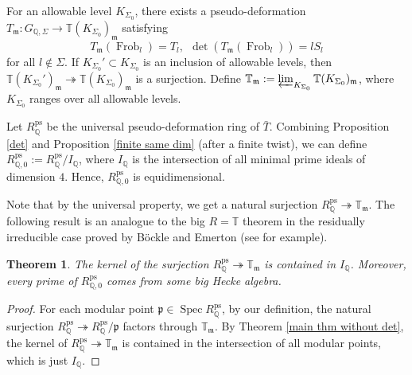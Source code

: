 \documentclass[a4paper, 12pt]{amsart}
\newtheorem{thm}{Theorem}[subsection]
\DeclareMathOperator{\Spec}{Spec}
\DeclareMathOperator{\Frob}{Frob}
\def\ps{\mathrm{ps}}
\newcommand{\Q}{\mathbb{Q}}
\newcommand{\T}{\mathbb{T}}
\newcommand{\kp}{\mathfrak{p}}
\newcommand{\km}{\mathfrak{m}}
\begin{document}
    For an allowable level $K_{\Sigma_0}$, there exists a pseudo-deformation $T_\km: G_{\Q, \Sigma} \to \T(K_{\Sigma_0})_\km$ satisfying 
    $$ T_\km(\Frob_l)=T_l ,  ~~\det(T_\km(\Frob_l)) = lS_l $$
    for all $l \notin \Sigma$. If $K_{\Sigma_0}' \subset K_{\Sigma_0}$ is an inclusion of allowable levels, then $\T(K_{\Sigma_0}')_\km \twoheadrightarrow \T(K_{\Sigma_0})_\km$ is a surjection. Define $\T_\km := \varprojlim_{K_{\Sigma_0}} \T(K_{\Sigma_0})_\km$, where $K_{\Sigma_0} $ ranges over all allowable levels.
    
    Let $R_\Q^\ps$ be the universal pseudo-deformation ring of $\bar{T}$.  Combining Proposition \ref{det} and Proposition \ref{finite same dim} (after a finite twist), we can define $R_{\Q, 0}^\ps := R_\Q^\ps/I_\Q$, where $I_\Q $ is the intersection of all minimal prime ideals of dimension $4$. Hence, $R_{\Q, 0}^\ps$ is equidimensional.
    
    Note that by the universal property, we get a natural surjection $R_\Q^\ps \twoheadrightarrow \T_\km $. The following result is an analogue to the big $R=\T$ theorem in the residually irreducible case proved by B\"ockle and Emerton (see \cite[Theorem 2.1]{Nakamura2023} for example).
    
    \begin{thm}\label{big R=T modular curve}
    	The kernel of the surjection $R_\Q^\ps \twoheadrightarrow \T_\km $ is contained in 
    	$I_\Q $. Moreover, every prime of $R_{\Q, 0}^\ps$ comes from some big Hecke algebra.
    \end{thm}
    
    \begin{proof}
    	For each modular point $\kp \in \Spec R_\Q^\ps$, by our definition, the natural surjection $R_\Q^\ps \twoheadrightarrow R_\Q^\ps/\kp$ factors through $\T_\km$. By Theorem \ref{main thm without det}, the kernel of $R_\Q^\ps \twoheadrightarrow \T_\km $ is contained in the intersection of all modular points, which is just $I_\Q $.
    \end{proof}
    
\end{document}
